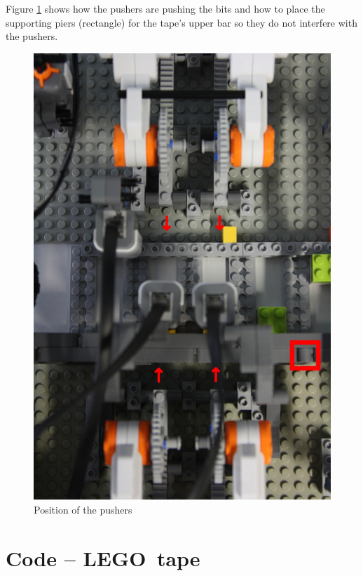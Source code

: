 \documentclass[%
  a4paper,%
  11pt,%
  blue,%
  hyperref	%
  ]{tubsartcl}
\begin{document}
\newpage

Figure \ref{pic:topview_pushers} shows how the pushers are pushing the bits and how to place the supporting piers (rectangle) for the tape's upper bar so they do not interfere with the pushers.

\begin{figure}[!htb]
\begin{center}
\includegraphics[scale=0.35]{graphics_lego/topview_pushers.jpg}
\end{center}
\caption{Position of the pushers}
\label{pic:topview_pushers}
\end{figure}


\section{Code -- LEGO\textregistered\, tape}
\end{document}
